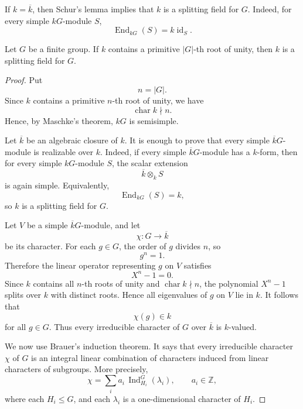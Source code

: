 \begin{remark}
    If \(k=\overline{k}\), then Schur's lemma implies that \(k\) is a splitting
    field for \(G\). Indeed, for every simple \(kG\)-module \(S\),
    \[
        \operatorname{End}_{kG}(S)=k\operatorname{id}_S.
    \]
\end{remark}

\begin{theorem}[Brauer]
    Let \(G\) be a finite group. If \(k\) contains a primitive
    \(|G|\)-th root of unity, then \(k\) is a splitting field for \(G\).
\end{theorem}

\begin{proof}
    Put
    \[
        n=|G|.
    \]
    Since \(k\) contains a primitive \(n\)-th root of unity, we have
    \[
        \operatorname{char}k\nmid n.
    \]
    Hence, by Maschke's theorem, \(kG\) is semisimple.

    Let \(\overline{k}\) be an algebraic closure of \(k\). It is enough to prove
    that every simple \(\overline{k}G\)-module is realizable over \(k\). Indeed, if
    every simple \(\overline{k}G\)-module has a \(k\)-form, then for every simple
    \(kG\)-module \(S\), the scalar extension
    \[
        \overline{k}\otimes_k S
    \]
    is again simple. Equivalently,
    \[
        \operatorname{End}_{kG}(S)=k,
    \]
    so \(k\) is a splitting field for \(G\).

    Let \(V\) be a simple \(\overline{k}G\)-module, and let
    \[
        \chi:G\longrightarrow \overline{k}
    \]
    be its character. For each \(g\in G\), the order of \(g\) divides \(n\), so
    \[
        g^n=1.
    \]
    Therefore the linear operator representing \(g\) on \(V\) satisfies
    \[
        X^n-1=0.
    \]
    Since \(k\) contains all \(n\)-th roots of unity and
    \(\operatorname{char}k\nmid n\), the polynomial \(X^n-1\) splits over \(k\)
    with distinct roots. Hence all eigenvalues of \(g\) on \(V\) lie in \(k\).
    It follows that
    \[
        \chi(g)\in k
    \]
    for all \(g\in G\). Thus every irreducible character of \(G\) over
    \(\overline{k}\) is \(k\)-valued.

    We now use Brauer's induction theorem. It says that every irreducible character
    \(\chi\) of \(G\) is an integral linear combination of characters induced from
    linear characters of subgroups. More precisely,
    \[
        \chi
        =
        \sum_i a_i\,\operatorname{Ind}_{H_i}^G(\lambda_i),
        \qquad a_i\in \mathbb{Z},
    \]
    where each \(H_i\leq G\), and each \(\lambda_i\) is a one-dimensional character
    of \(H_i\).


\end{proof}

